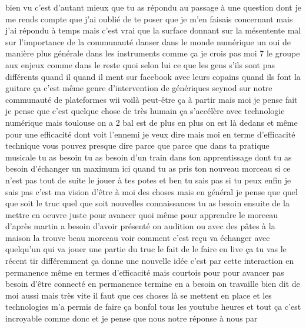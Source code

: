  bien vu c'est d'autant mieux que tu as répondu au passage à une question dont je me rends compte que j'ai oublié de te poser que je m'en faisais concernant mais j'ai répondu à temps mais c'est vrai que la surface donnant sur la mésentente mal sur l'importance de la communauté danser dans le monde numérique un oui de manière plus générale dans les instruments comme ça je crois pas moi 7 le groupe aux enjeux comme dans le reste quoi selon lui ce que les gens s'ils sont pas différents quand il quand il ment sur facebook avec leurs copains quand ils font la guitare ça c'est même genre d'intervention de génériques seynod sur notre communauté de plateformes wii voilà peut-être ça à partir mais moi je pense fait je pense que c'est quelque chose de très humain ça s'accélère avec technologie numérique mais toulouse on a 2 bal est de plus en plus on est là dedans et même pour une efficacité dont voit l'ennemi je veux dire mais moi en terme d'efficacité technique vous pouvez presque dire parce que parce que dans ta pratique musicale tu as besoin tu as besoin d'un train dans ton apprentissage dont tu as besoin d'échanger un maximum ici quand tu as pris ton nouveau morceau si ce n'est pas tout de suite le jouer à tes potes et ben tu sais pas si tu peux enfin je sais pas c'est ma vision d'être à moi des choses mais en général je pense que quel que soit le truc quel que soit nouvelles connaissances tu as besoin ensuite de la mettre en oeuvre juste pour avancer quoi même pour apprendre le morceau d'après martin a besoin d'avoir présenté on audition ou avec des pâtes à la maison la trouve beau morceau voir comment c'est reçu va échanger avec quelqu'un qui va jouer une partie du truc le fait de le faire en live ça tu vas le récent tir différemment ça donne une nouvelle idée c'est par cette interaction en permanence même en termes d'efficacité mais courtois pour pour avancer pas besoin d'être connecté en permanence termine en a besoin on travaille bien dit de moi aussi mais très vite il faut que ces choses là se mettent en place et les technologies m'a permis de faire ça bonfol tous les youtube heures et tout ça c'est incroyable comme donc et je pense que nous notre réponse à nous par 
